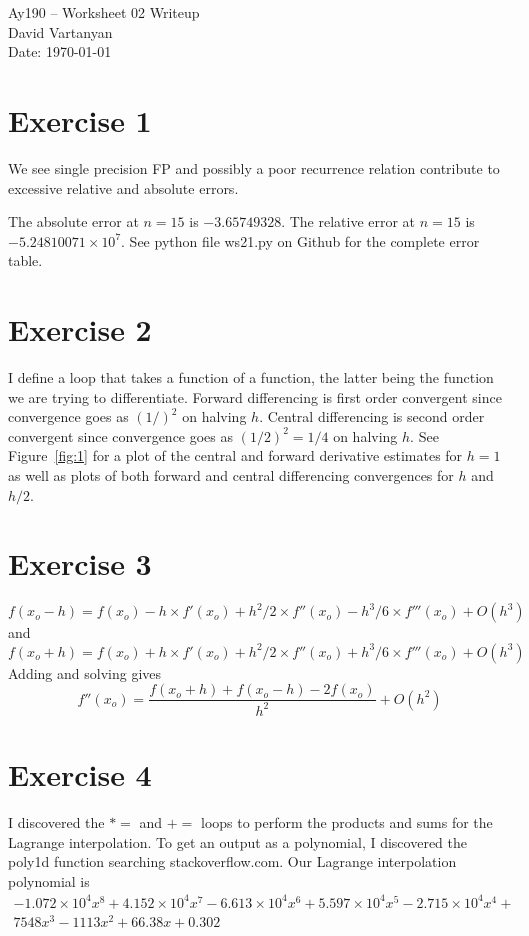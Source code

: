\documentclass[11pt,letterpaper]{article}
\begin{document}
\begin{center}
\Large
Ay190 -- Worksheet 02 Writeup\\
David Vartanyan\\
Date: \today
\end{center}

\section{Exercise 1}
We see single precision FP and possibly a poor recurrence relation contribute to excessive relative and absolute errors.

The absolute error at $n=15$ is $-3.65749328$. \newline The relative error at $n=15$ is $-5.24810071 \times 10^7$. See python file ws21.py on Github for the complete error table.

\section{Exercise 2}
I define a loop that takes a function of a function, the latter being the function we are trying to differentiate. Forward differencing is first order convergent since convergence goes as $(1/)^2$ on halving $h$. Central differencing is second order convergent since convergence goes as $(1/2)^2=1/4$ on halving $h$. \newline See Figure~\ref{fig:1} for a plot of the central and forward derivative estimates for $h=1$ as well as plots of both forward and central differencing convergences for $h$ and $h/2$.



\section{Exercise 3}

\begin{equation}
f(x_o-h)= f(x_o) - h \times f'(x_o) + h^2/2 \times f''(x_o) - h^3/6 \times f'''(x_o) + O(h^3)
\end{equation}
and
\begin{equation}
f(x_o+h)= f(x_o) + h \times f'(x_o) + h^2/2 \times f''(x_o) + h^3/6 \times f'''(x_o) + O(h^3)
\end{equation}
Adding and solving gives
\begin{equation}
f''(x_o) = \frac{f(x_o+h)+f(x_o-h) - 2 f(x_o)}{h^2} + O(h^2)
\end{equation}

\section{Exercise 4}
I discovered the $*=$ and $+=$ loops to perform the products and sums for the Lagrange interpolation. To get an output as a polynomial, I discovered the poly1d function searching stackoverflow.com.  Our Lagrange interpolation polynomial is\begin{multline}-1.072 \times 10^4 x^8 + 4.152 \times 10^4 x^7 - 6.613 \times 10^4 x^6 + 5.597 \times 10^4 x^5 - 2.715 \times 10^4 x^4 +\\
 7548 x^3 - 1113 x^2 + 66.38 x + 0.302 \end{multline}
\end{document}

